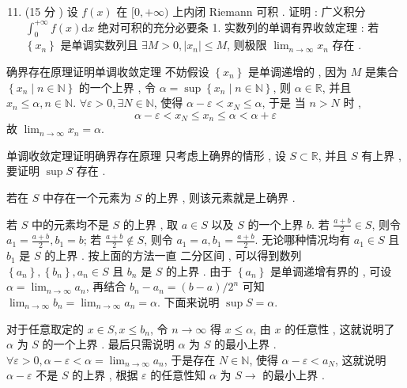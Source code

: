 \documentclass[10pt]{article}
\begin{document}
\begin{enumerate}
  \setcounter{enumi}{10}
  \item (15  分 )  设  $f(x)$  在  $[0,+\infty)$  上内闭  Riemann  可积 .  证明 :  广义积分  $\int_{0}^{+\infty} f(x) \mathrm{d} x$  绝对可积的充分必要条  1.  实数列的单调有界收敛定理 :  若  $\left\{x_{n}\right\}$  是单调实数列且  $\exists M>0,\left|x_{n}\right| \leqslant M$,  则极限  $\lim _{n \rightarrow \infty} x_{n}$  存在 .
\end{enumerate}
 确界存在原理证明单调收敛定理   不妨假设  $\left\{x_{n}\right\}$  是单调递增的 ,  因为  $M$  是集合  $\left\{x_{n} \mid n \in \mathbb{N}\right\}$  的一个上界 ,  令  $\alpha=\sup \left\{x_{n} \mid n \in \mathbb{N}\right\}$,  则  $\alpha \in \mathbb{R}$,  并且  $x_{n} \leqslant \alpha, n \in \mathbb{N}$. $\forall \varepsilon>0, \exists N \in \mathbb{N}$,  使得  $\alpha-\varepsilon<x_{N} \leqslant \alpha$,  于是   当  $n>N$  时 ,
$$
\alpha-\varepsilon<x_{N} \leqslant x_{n} \leqslant \alpha<\alpha+\varepsilon
$$
 故  $\lim _{n \rightarrow \infty} x_{n}=\alpha$.

 单调收敛定理证明确界存在原理   只考虑上确界的情形 ,  设  $S \subset \mathbb{R}$,  并且  $S$  有上界 ,  要证明  $\sup S$  存在 .

 若在  $S$  中存在一个元素为  $S$  的上界 ,  则该元素就是上确界 .

 若  $S$  中的元素均不是  $S$  的上界 ,  取  $a \in S$  以及  $S$  的一个上界  $b$.  若  $\frac{a+b}{2} \in S$,  则令  $a_{1}=\frac{a+b}{2}, b_{1}=b$;  若  $\frac{a+b}{2} \notin S$,  则令  $a_{1}=a, b_{1}=\frac{a+b}{2}$.  无论哪种情况均有  $a_{1} \in S$  且  $b_{1}$  是  $S$  的上界 .  按上面的方法一直   二分区间 ,  可以得到数列  $\left\{a_{n}\right\},\left\{b_{n}\right\}, a_{n} \in S$  且  $b_{n}$  是  $S$  的上界 .  由于  $\left\{a_{n}\right\}$  是单调递增有界的 ,  可设  $\alpha=\lim _{n \rightarrow \infty} a_{n}$,  再结合  $b_{n}-a_{n}=(b-a) / 2^{n}$  可知  $\lim _{n \rightarrow \infty} b_{n}=\lim _{n \rightarrow \infty} a_{n}=\alpha$.  下面来说明  $\sup S=\alpha$.

 对于任意取定的  $x \in S, x \leqslant b_{n}$,  令  $n \rightarrow \infty$  得  $x \leqslant \alpha$,  由  $x$  的任意性 ,  这就说明了  $\alpha$  为  $S$  的一个上界 .  最后只需说明  $\alpha$  为  $S$  的最小上界 . $\forall \varepsilon>0, \alpha-\varepsilon<\alpha=\lim _{n \rightarrow \infty} a_{n}$,  于是存在  $N \in \mathbb{N}$,  使得  $\alpha-\varepsilon<a_{N}$,  这就说明  $\alpha-\varepsilon$  不是  $S$  的上界 ,  根据  $\varepsilon$  的任意性知  $\alpha$  为  $S \rightarrow$  的最小上界 .
\end{document}
